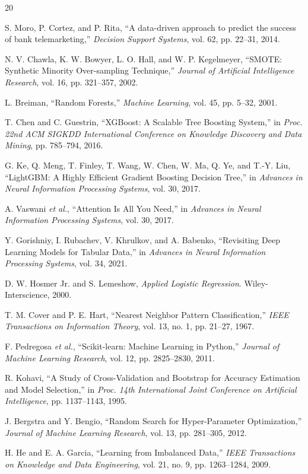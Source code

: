 \documentclass[10pt,twocolumn]{article}
\begin{document}
\begin{thebibliography}{20}

S. Moro, P. Cortez, and P. Rita, ``A data-driven approach to predict the success of bank telemarketing,'' \emph{Decision Support Systems}, vol. 62, pp. 22--31, 2014.

N. V. Chawla, K. W. Bowyer, L. O. Hall, and W. P. Kegelmeyer, ``SMOTE: Synthetic Minority Over-sampling Technique,'' \emph{Journal of Artificial Intelligence Research}, vol. 16, pp. 321--357, 2002.

L. Breiman, ``Random Forests,'' \emph{Machine Learning}, vol. 45, pp. 5--32, 2001.

T. Chen and C. Guestrin, ``XGBoost: A Scalable Tree Boosting System,'' in \emph{Proc. 22nd ACM SIGKDD International Conference on Knowledge Discovery and Data Mining}, pp. 785--794, 2016.

G. Ke, Q. Meng, T. Finley, T. Wang, W. Chen, W. Ma, Q. Ye, and T.-Y. Liu, ``LightGBM: A Highly Efficient Gradient Boosting Decision Tree,'' in \emph{Advances in Neural Information Processing Systems}, vol. 30, 2017.

A. Vaswani \emph{et al.}, ``Attention Is All You Need,'' in \emph{Advances in Neural Information Processing Systems}, vol. 30, 2017.

Y. Gorishniy, I. Rubachev, V. Khrulkov, and A. Babenko, ``Revisiting Deep Learning Models for Tabular Data,'' in \emph{Advances in Neural Information Processing Systems}, vol. 34, 2021.

D. W. Hosmer Jr. and S. Lemeshow, \emph{Applied Logistic Regression}. Wiley-Interscience, 2000.

T. M. Cover and P. E. Hart, ``Nearest Neighbor Pattern Classification,'' \emph{IEEE Transactions on Information Theory}, vol. 13, no. 1, pp. 21--27, 1967.

F. Pedregosa \emph{et al.}, ``Scikit-learn: Machine Learning in Python,'' \emph{Journal of Machine Learning Research}, vol. 12, pp. 2825--2830, 2011.

R. Kohavi, ``A Study of Cross-Validation and Bootstrap for Accuracy Estimation and Model Selection,'' in \emph{Proc. 14th International Joint Conference on Artificial Intelligence}, pp. 1137--1143, 1995.

J. Bergstra and Y. Bengio, ``Random Search for Hyper-Parameter Optimization,'' \emph{Journal of Machine Learning Research}, vol. 13, pp. 281--305, 2012.

H. He and E. A. Garcia, ``Learning from Imbalanced Data,'' \emph{IEEE Transactions on Knowledge and Data Engineering}, vol. 21, no. 9, pp. 1263--1284, 2009.

\end{thebibliography}
\end{document}
